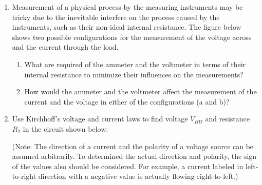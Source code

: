\begin{enumerate}

\item Measurement of a physical process by the measuring instruments may 
  be tricky due to the inevitable interfere on the process caused by the 
  instruments, such as their non-ideal internal resistance. The figure
  below shows two possible configurations for the measurement of the voltage
  across and the current through the load. 


  \begin{enumerate}
  \item What are required of the ammeter and the voltmeter in terms of their
    internal resistance to minimize their influences on the measurements? 


  \item How would the ammeter and the voltmeter affect the measurement of the
    current and the voltage in either of the configurations (a and b)?
  \end{enumerate}


\item Use Kirchhoff's voltage and current laws to find voltage $V_{BD}$ and 
  resistance $R_2$ in the circuit shown below:


(Note: The direction of a current and the polarity of a voltage source can
be assumed arbitrarily. To determined the actual direction and polarity, the
sign of the values also should be considered. For example, a current labeled 
in left-to-right direction with a negative value is actually flowing 
right-to-left.)



\end{enumerate}
